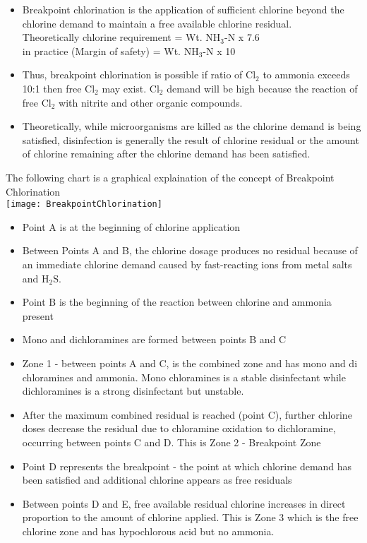 \begin{itemize}
\begin{itemize}
				\item Breakpoint chlorination is the application of sufficient chlorine beyond the chlorine demand to maintain a free available chlorine residual.\\  Theoretically chlorine requirement = Wt. NH$_3$-N x 7.6\\
				in practice (Margin of safety)     = Wt. NH$_3$-N x 10\\
				\item Thus, breakpoint chlorination is possible if ratio of Cl$_2$ to ammonia exceeds 10:1 then free Cl$_2$ may exist. Cl$_2$ demand will be high because the reaction of free Cl$_2$ with nitrite and other organic compounds. 
				\item Theoretically, while microorganisms are killed as the chlorine demand is being satisfied, disinfection is generally the result of chlorine residual or the amount of chlorine remaining after the chlorine demand has been satisfied.
			\end{itemize}
The following chart is a graphical explaination of the concept of Breakpoint Chlorination\\
			\texttt{[image: BreakpointChlorination]}
			\begin{itemize}
				\item Point A is at the beginning of chlorine application
				\item Between Points A and B, the chlorine dosage produces no residual because of an immediate chlorine demand caused by fast-reacting ions from metal salts and H$_2$S.
				\item Point B is the beginning of the reaction between chlorine and ammonia present
				\item Mono and dichloramines are formed between points B and C
				\item Zone 1 - between points A and C, is the combined zone and has mono and di  chloramines and ammonia.  Mono chloramines is a stable disinfectant while dichloramines is a strong disinfectant but unstable.
				\item After the maximum combined residual is reached (point C), further chlorine doses decrease the residual due to chloramine oxidation to dichloramine, occurring between points C and D.  This is Zone 2 - Breakpoint Zone
				\item Point D represents the breakpoint - the point at which chlorine demand has been satisfied and additional chlorine appears as free residuals
				\item Between points D and E, free available residual chlorine increases in direct proportion to the amount of chlorine applied.  This is Zone 3 which is the free chlorine zone and has hypochlorous acid but no ammonia. \\

\end{itemize}
\end{itemize}
